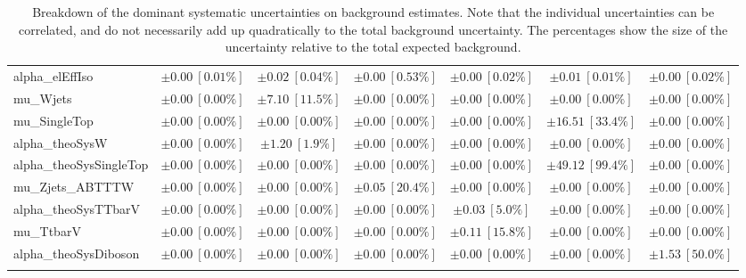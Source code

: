 \begin{sidewaystable}
\begin{center}
\begin{tabular*}{\textwidth}{@{\extracolsep{\fill}}lcccccc}
alpha\_elEffIso         & $\pm 0.00\ [0.01\%] $          & $\pm 0.02\ [0.04\%] $          & $\pm 0.00\ [0.53\%] $          & $\pm 0.00\ [0.02\%] $          & $\pm 0.01\ [0.01\%] $          & $\pm 0.00\ [0.02\%] $       \\
mu\_Wjets         & $\pm 0.00\ [0.00\%] $          & $\pm 7.10\ [11.5\%] $          & $\pm 0.00\ [0.00\%] $          & $\pm 0.00\ [0.00\%] $          & $\pm 0.00\ [0.00\%] $          & $\pm 0.00\ [0.00\%] $       \\
mu\_SingleTop         & $\pm 0.00\ [0.00\%] $          & $\pm 0.00\ [0.00\%] $          & $\pm 0.00\ [0.00\%] $          & $\pm 0.00\ [0.00\%] $          & $\pm 16.51\ [33.4\%] $          & $\pm 0.00\ [0.00\%] $       \\
alpha\_theoSysW         & $\pm 0.00\ [0.00\%] $          & $\pm 1.20\ [1.9\%] $          & $\pm 0.00\ [0.00\%] $          & $\pm 0.00\ [0.00\%] $          & $\pm 0.00\ [0.00\%] $          & $\pm 0.00\ [0.00\%] $       \\
alpha\_theoSysSingleTop         & $\pm 0.00\ [0.00\%] $          & $\pm 0.00\ [0.00\%] $          & $\pm 0.00\ [0.00\%] $          & $\pm 0.00\ [0.00\%] $          & $\pm 49.12\ [99.4\%] $          & $\pm 0.00\ [0.00\%] $       \\
mu\_Zjets\_ABTTTW         & $\pm 0.00\ [0.00\%] $          & $\pm 0.00\ [0.00\%] $          & $\pm 0.05\ [20.4\%] $          & $\pm 0.00\ [0.00\%] $          & $\pm 0.00\ [0.00\%] $          & $\pm 0.00\ [0.00\%] $       \\
alpha\_theoSysTTbarV         & $\pm 0.00\ [0.00\%] $          & $\pm 0.00\ [0.00\%] $          & $\pm 0.00\ [0.00\%] $          & $\pm 0.03\ [5.0\%] $          & $\pm 0.00\ [0.00\%] $          & $\pm 0.00\ [0.00\%] $       \\
mu\_TtbarV         & $\pm 0.00\ [0.00\%] $          & $\pm 0.00\ [0.00\%] $          & $\pm 0.00\ [0.00\%] $          & $\pm 0.11\ [15.8\%] $          & $\pm 0.00\ [0.00\%] $          & $\pm 0.00\ [0.00\%] $       \\
alpha\_theoSysDiboson         & $\pm 0.00\ [0.00\%] $          & $\pm 0.00\ [0.00\%] $          & $\pm 0.00\ [0.00\%] $          & $\pm 0.00\ [0.00\%] $          & $\pm 0.00\ [0.00\%] $          & $\pm 1.53\ [50.0\%] $       \\
\noalign{\smallskip}\hline\noalign{\smallskip}
\end{tabular*}
\end{center}
\caption[Breakdown of uncertainty on background estimates]{
Breakdown of the dominant systematic uncertainties on background estimates.
Note that the individual uncertainties can be correlated, and do not necessarily add up quadratically to 
the total background uncertainty. The percentages show the size of the uncertainty relative to the total expected background.
\label{table.results.bkgestimate.uncertainties.VRW_bybkg}}
\end{sidewaystable}
%